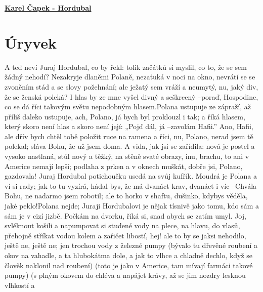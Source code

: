 \documentclass[11pt]{article}
\begin{document}
    \begin{center}
        \underline{\textbf{\Huge Karel Čapek - Hordubal}}
    \end{center}
    \section*{Úryvek}
    A teď neví Juraj Hordubal, co by řekl: tolik začátků si myslil, co to, že se sem žádný nehodí? Nezakryje dlaněmi Polaně, nezaťuká v noci na okno, nevrátí se se zvoněním stád a se slovy požehnání; ale ježatý sem vráží a neumytý, nu, jaký div, že se ženská poleká? I hlas by ze mne vyšel divný a seškrcený –poraď, Hospodine, co se dá říci takovým světu nepodobným hlasem.Polana ustupuje ze zápraží, až příliš daleko ustupuje, ach, Polano, já bych byl proklouzl i tak; a říká hlasem, který skoro není hlas a skoro není její: „Pojď dál, já –zavolám Hafii.” Ano, Hafii, ale dřív bych chtěl tobě položit ruce na ramena a říci, nu, Polano, nerad jsem tě polekal; sláva Bohu, že už jsem doma. A vida, jak jsi se zařídila: nová je postel a vysoko nastlaná, stůl nový a těžký, na stěně svaté obrazy, inu, brachu, to ani v Americe nemají lepší; podlaha z prken a v oknech muškát, dobře jsi, Polano, gazdovala! Juraj Hordubal potichoučku usedá na svůj kufřík. Moudrá je Polana a ví si rady; jak to tu vyzírá, hádal bys, že má dvanáct krav, dvanáct i víc –Chvála Bohu, ne nadarmo jsem robotil; ale to horko v shaftu, dušinko, kdybys věděla, jaké peklo!Polana nejde; Juraji Hordubalovi je nějak tísnivě jako tomu, kdo sám a sám je v cizí jizbě. Počkám na dvorku, říká si, snad abych se zatím umyl. Joj, svléknout košili  a  napumpovat  si studené vody na plece, na hlavu, do vlasů, přehojně stříkat vodou kolem a zařičet libostí, hej! ale to by se jaksi nehodilo, ještě ne, ještě ne; jen trochou vody z železné pumpy (bývalo tu dřevěné roubení a okov na vahadle, a ta hlubokátma dole, a jak to vlhce a chladně dechlo, když se člověk naklonil nad roubení) (toto je jako v Americe, tam mívají farmáci takové pumpy) (s plným okovem do chléva a napájet krávy, až se jim nozdry lesknou vlhkostí a 
\end{document}
